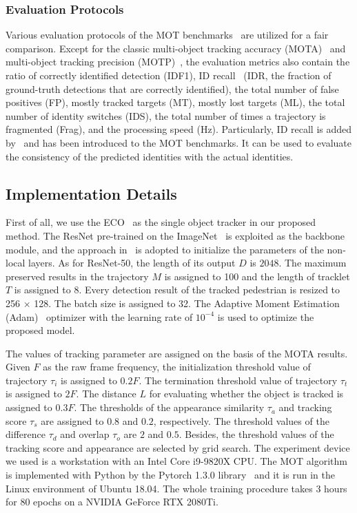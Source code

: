 \documentclass[times,twocolumn,final,authoryear]{elsarticle}
\begin{document}
\subsubsection{Evaluation Protocols}
Various evaluation protocols of the MOT benchmarks~\citep{RN583} are utilized for a fair comparison. 
Except for the classic multi-object tracking accuracy (MOTA)~\citep{RN475} and multi-object tracking precision (MOTP)~\citep{RN550}, the evaluation metrics also contain the ratio of correctly identified detection (IDF1), ID recall~\citep{ristani2016performance} (IDR, the fraction of ground-truth detections that are correctly identified), the total number of false positives (FP), mostly tracked targets (MT), mostly lost targets (ML), the total number of identity switches (IDS), the total number of times a trajectory is fragmented (Frag), and the processing speed (Hz). 
Particularly, ID recall is added by~\citep{ristani2016performance} and has been introduced to the MOT benchmarks. 
It can be used to evaluate the consistency of the predicted identities with the actual identities.


\subsection{Implementation Details}
First of all, we use the ECO~\citep{danelljan2017eco} as the single object tracker in our proposed method.
The ResNet pre-trained on the ImageNet~\citep{RN991} is exploited as the backbone module, and the approach in~\citep{RN580} is adopted to initialize the parameters of the non-local layers. 
As for ResNet-50, the length of its output $D$ is $2048$.
The maximum preserved results in the trajectory $M$ is assigned to 100 and the length of tracklet $T$ is assigned to 8.
Every detection result of the tracked pedestrian is resized to 256 $\times$ 128. 
The batch size is assigned to 32.
The Adaptive Moment Estimation (Adam)~\citep{RN586} optimizer with the learning rate of $10^{-4}$ is used to optimize the proposed model.

The values of tracking {parameter} are assigned on the basis of the MOTA results.
Given $ F $ as the raw frame frequency, 
the initialization threshold value of trajectory $ \tau _i $ is assigned to $ 0.2F $. 
The termination threshold value of trajectory $ \tau _t $ is assigned to $ 2F $. 
The distance $ L $ for evaluating whether the object is tracked is assigned to $ 0.3F $.
The thresholds of the appearance similarity $ \tau _a $ and tracking score $ \tau _s $ are assigned to $ 0.8 $ and $ 0.2 $, respectively. 
The threshold values of the difference $\tau_d$ and overlap $\tau_o$ are $2$ and $0.5$. 
Besides, the threshold values of the tracking score and appearance are selected by grid search.
The experiment device we used is a workstation with an Intel Core i9-9820X CPU.
{The} MOT algorithm is implemented with Python by the Pytorch 1.3.0 library~\citep{paszke2019pytorch} and it is run in the Linux environment of Ubuntu 18.04.
The whole training procedure takes 3 hours for 80 epochs on a NVIDIA GeForce RTX 2080Ti.
\end{document}
